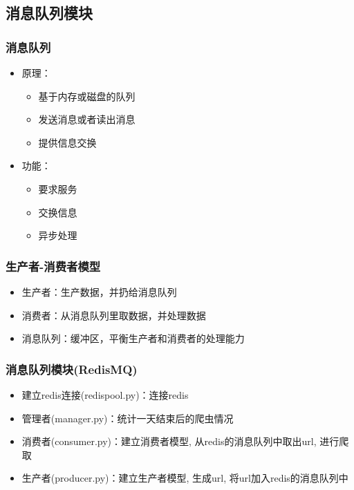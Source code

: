\documentclass{beamer}
\begin{document}
\subsection{消息队列模块}
\begin{frame}
\frametitle{消息队列}
\begin{itemize}
\item 原理：
\begin{itemize}
\item 基于内存或磁盘的队列
\item 发送消息或者读出消息
\item 提供信息交换
\end{itemize}
\item 功能：
\begin{itemize}
\item 要求服务
\item 交换信息
\item 异步处理
\end{itemize}
\end{itemize}
\end{frame}

\begin{frame}
\frametitle{生产者-消费者模型}
\begin{itemize}
\item 生产者：生产数据，并扔给消息队列
\item 消费者：从消息队列里取数据，并处理数据
\item 消息队列：缓冲区，平衡生产者和消费者的处理能力
\end{itemize}
\end{frame}

\begin{frame}
\frametitle{消息队列模块(RedisMQ)}
\begin{itemize}
\item 建立redis连接(redispool.py)：连接redis
\item 管理者(manager.py)：统计一天结束后的爬虫情况
\item 消费者(consumer.py)：建立消费者模型, 从redis的消息队列中取出url, 进行爬取
\item 生产者(producer.py)：建立生产者模型, 生成url, 将url加入redis的消息队列中
\end{itemize}
\end{frame}
\end{document}
